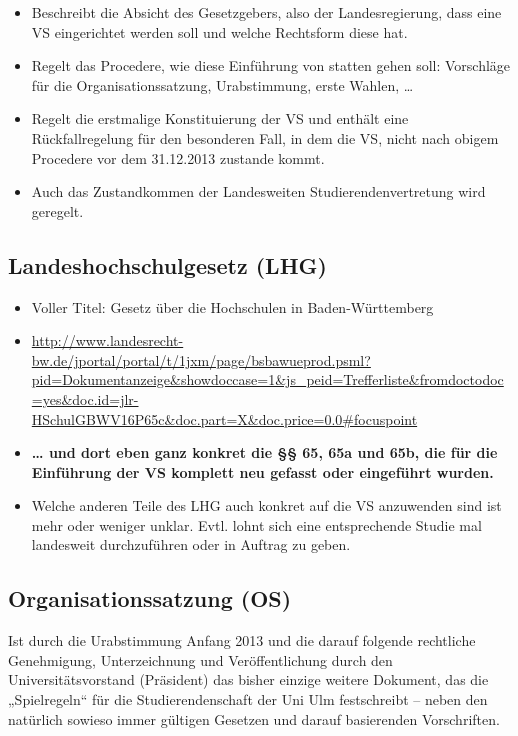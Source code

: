 \documentclass[
10pt,
a4paper,
twoside,								%
titlepage=false,							%
draft=false								%
]{scrartcl}
\begin{document}
\begin{itemize}
	\item Beschreibt die Absicht des Gesetzgebers, also der Landesregierung, dass eine VS eingerichtet werden soll und welche Rechtsform diese hat.
	\item Regelt das Procedere, wie diese Einführung von statten gehen soll: Vorschläge für die Organisationssatzung, Urabstimmung, erste Wahlen, …
	\item Regelt die erstmalige Konstituierung der VS und enthält eine Rückfallregelung für den besonderen Fall, in dem die VS, nicht nach obigem Procedere vor dem 31.12.2013 zustande kommt.
	\item Auch das Zustandkommen der Landesweiten Studierendenvertretung wird geregelt.
\end{itemize}


\subsection{Landeshochschulgesetz (LHG)}
\begin{itemize}
	\item Voller Titel: Gesetz über die Hochschulen in Baden-Württemberg
	\item \url{http://www.landesrecht-bw.de/jportal/portal/t/1jxm/page/bsbawueprod.psml?pid=Dokumentanzeige&showdoccase=1&js_peid=Trefferliste&fromdoctodoc=yes&doc.id=jlr-HSchulGBWV16P65c&doc.part=X&doc.price=0.0#focuspoint}
	\item \textbf{… und dort eben ganz konkret die §§ 65, 65a und 65b, die für die Einführung der VS komplett neu gefasst oder eingeführt wurden.}
	\item Welche anderen Teile des LHG auch konkret auf die VS anzuwenden sind ist mehr oder weniger unklar. Evtl. lohnt sich eine entsprechende Studie mal landesweit durchzuführen oder in Auftrag zu geben.
\end{itemize}

\subsection{Organisationssatzung (OS)}

Ist durch die Urabstimmung Anfang 2013 und die darauf folgende rechtliche Genehmigung, Unterzeichnung und Veröffentlichung durch den Universitätsvorstand (Präsident) das bisher einzige weitere Dokument, das die „Spielregeln“ für die Studierendenschaft der Uni Ulm festschreibt – neben den natürlich sowieso immer gültigen Gesetzen und darauf basierenden Vorschriften.
\end{document}
